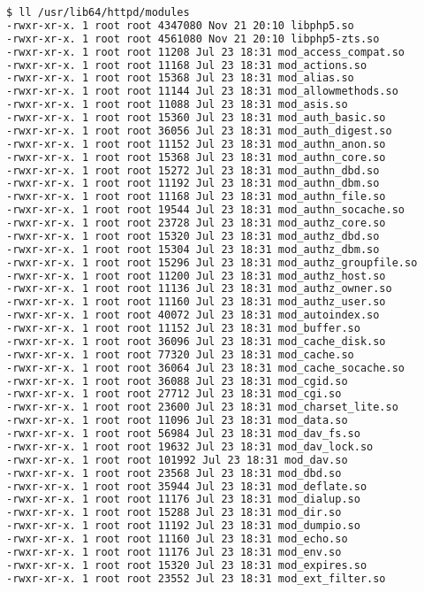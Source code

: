 \begin{lstlisting}[language=bash]
$ ll /usr/lib64/httpd/modules
-rwxr-xr-x. 1 root root 4347080 Nov 21 20:10 libphp5.so
-rwxr-xr-x. 1 root root 4561080 Nov 21 20:10 libphp5-zts.so
-rwxr-xr-x. 1 root root 11208 Jul 23 18:31 mod_access_compat.so
-rwxr-xr-x. 1 root root 11168 Jul 23 18:31 mod_actions.so
-rwxr-xr-x. 1 root root 15368 Jul 23 18:31 mod_alias.so
-rwxr-xr-x. 1 root root 11144 Jul 23 18:31 mod_allowmethods.so
-rwxr-xr-x. 1 root root 11088 Jul 23 18:31 mod_asis.so
-rwxr-xr-x. 1 root root 15360 Jul 23 18:31 mod_auth_basic.so
-rwxr-xr-x. 1 root root 36056 Jul 23 18:31 mod_auth_digest.so
-rwxr-xr-x. 1 root root 11152 Jul 23 18:31 mod_authn_anon.so
-rwxr-xr-x. 1 root root 15368 Jul 23 18:31 mod_authn_core.so
-rwxr-xr-x. 1 root root 15272 Jul 23 18:31 mod_authn_dbd.so
-rwxr-xr-x. 1 root root 11192 Jul 23 18:31 mod_authn_dbm.so
-rwxr-xr-x. 1 root root 11168 Jul 23 18:31 mod_authn_file.so
-rwxr-xr-x. 1 root root 19544 Jul 23 18:31 mod_authn_socache.so
-rwxr-xr-x. 1 root root 23728 Jul 23 18:31 mod_authz_core.so
-rwxr-xr-x. 1 root root 15320 Jul 23 18:31 mod_authz_dbd.so
-rwxr-xr-x. 1 root root 15304 Jul 23 18:31 mod_authz_dbm.so
-rwxr-xr-x. 1 root root 15296 Jul 23 18:31 mod_authz_groupfile.so
-rwxr-xr-x. 1 root root 11200 Jul 23 18:31 mod_authz_host.so
-rwxr-xr-x. 1 root root 11136 Jul 23 18:31 mod_authz_owner.so
-rwxr-xr-x. 1 root root 11160 Jul 23 18:31 mod_authz_user.so
-rwxr-xr-x. 1 root root 40072 Jul 23 18:31 mod_autoindex.so
-rwxr-xr-x. 1 root root 11152 Jul 23 18:31 mod_buffer.so
-rwxr-xr-x. 1 root root 36096 Jul 23 18:31 mod_cache_disk.so
-rwxr-xr-x. 1 root root 77320 Jul 23 18:31 mod_cache.so
-rwxr-xr-x. 1 root root 36064 Jul 23 18:31 mod_cache_socache.so
-rwxr-xr-x. 1 root root 36088 Jul 23 18:31 mod_cgid.so
-rwxr-xr-x. 1 root root 27712 Jul 23 18:31 mod_cgi.so
-rwxr-xr-x. 1 root root 23600 Jul 23 18:31 mod_charset_lite.so
-rwxr-xr-x. 1 root root 11096 Jul 23 18:31 mod_data.so
-rwxr-xr-x. 1 root root 56984 Jul 23 18:31 mod_dav_fs.so
-rwxr-xr-x. 1 root root 19632 Jul 23 18:31 mod_dav_lock.so
-rwxr-xr-x. 1 root root 101992 Jul 23 18:31 mod_dav.so
-rwxr-xr-x. 1 root root 23568 Jul 23 18:31 mod_dbd.so
-rwxr-xr-x. 1 root root 35944 Jul 23 18:31 mod_deflate.so
-rwxr-xr-x. 1 root root 11176 Jul 23 18:31 mod_dialup.so
-rwxr-xr-x. 1 root root 15288 Jul 23 18:31 mod_dir.so
-rwxr-xr-x. 1 root root 11192 Jul 23 18:31 mod_dumpio.so
-rwxr-xr-x. 1 root root 11160 Jul 23 18:31 mod_echo.so
-rwxr-xr-x. 1 root root 11176 Jul 23 18:31 mod_env.so
-rwxr-xr-x. 1 root root 15320 Jul 23 18:31 mod_expires.so
-rwxr-xr-x. 1 root root 23552 Jul 23 18:31 mod_ext_filter.so

\end{lstlisting}
